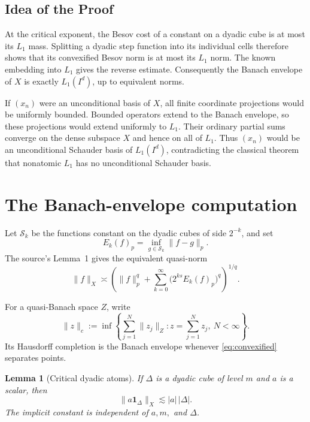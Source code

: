 \documentclass[10pt]{article}
\newtheorem{lemma}[theorem]{Lemma}
\newcommand{\one}{\mathbf 1}
\begin{document}
\subsection*{Idea of the Proof}

At the critical exponent, the Besov cost of a constant on a dyadic cube is
at most its $L_1$ mass.  Splitting a dyadic step function into its individual
cells therefore shows that its convexified Besov norm is at most its
$L_1$ norm.  The known embedding into $L_1$ gives the reverse estimate.
Consequently the Banach envelope of $X$ is exactly $L_1(I^d)$, up to
equivalent norms.

If $(x_n)$ were an unconditional basis of $X$, all finite coordinate
projections would be uniformly bounded.  Bounded operators extend to the
Banach envelope, so these projections would extend uniformly to $L_1$.
Their ordinary partial sums converge on the dense subspace $X$ and hence on
all of $L_1$.  Thus $(x_n)$ would be an unconditional Schauder basis of
$L_1(I^d)$, contradicting the classical theorem that nonatomic $L_1$ has no
unconditional Schauder basis.

\section{The Banach-envelope computation}

Let $\mathcal S_k$ be the functions constant on the dyadic cubes of side
$2^{-k}$, and set
\[
 E_k(f)_p=\inf_{g\in\mathcal S_k}\|f-g\|_p.
\]
The source's Lemma~1 gives the equivalent quasi-norm
\begin{equation}
 \|f\|_X\asymp
 \left(\|f\|_p^q+
 \sum_{k=0}^{\infty}\bigl(2^{ks}E_k(f)_p\bigr)^q\right)^{1/q}.
 \label{eq:approx}
\end{equation}

For a quasi-Banach space $Z$, write
\begin{equation}
 \|z\|_{c}:=
 \inf\left\{\sum_{j=1}^N\|z_j\|_Z:
 z=\sum_{j=1}^N z_j,\ N<\infty\right\}.
 \label{eq:convexified}
\end{equation}
Its Hausdorff completion is the Banach envelope whenever
\eqref{eq:convexified} separates
points.

\begin{lemma}[Critical dyadic atoms]\label{lem:atoms}
If $\Delta$ is a dyadic cube of level $m$ and $a$ is a scalar, then
\[
 \|a\one_\Delta\|_X\lesssim |a|\,|\Delta|.
 \tag{4}
\]
The implicit constant is independent of $a,m,$ and $\Delta$.
\end{lemma}
\end{document}
